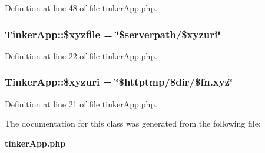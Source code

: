 Definition at line 48 of file tinker\-App.php.
\subsubsection{\setlength{\rightskip}{0pt plus 5cm}Tinker\-App::\$xyzfile = \char`\"{}\$serverpath/\$xyzuri\char`\"{}}\label{classTinkerApp_o7}




Definition at line 22 of file tinker\-App.php.
\subsubsection{\setlength{\rightskip}{0pt plus 5cm}Tinker\-App::\$xyzuri = \char`\"{}\$httptmp/\$dir/\$fn.xyz\char`\"{}}\label{classTinkerApp_o6}




Definition at line 21 of file tinker\-App.php.

The documentation for this class was generated from the following file:\begin{CompactItemize}
\item 
{\bf tinker\-App.php}\end{CompactItemize}
